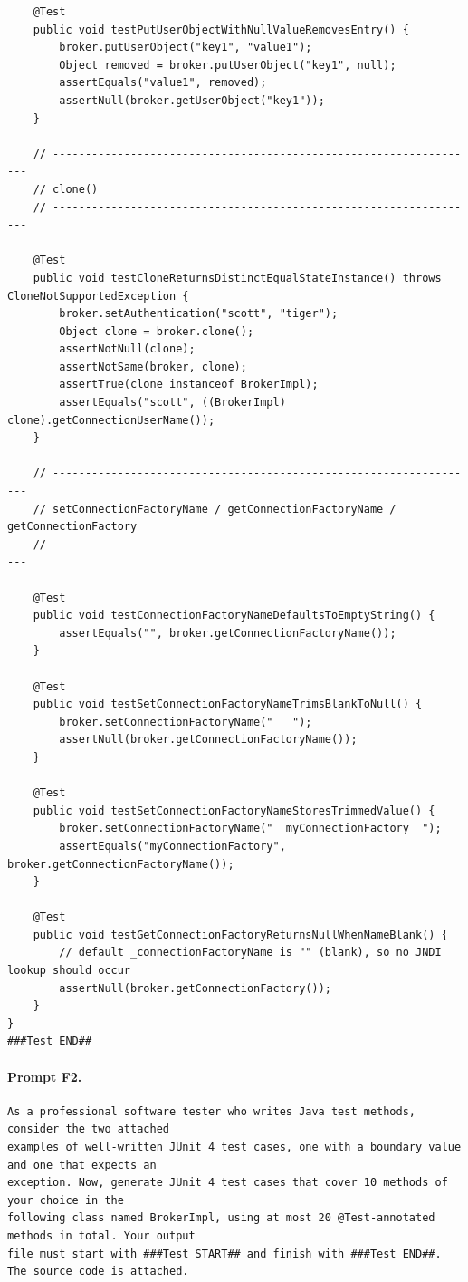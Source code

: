 \begin{lstlisting}
    @Test
    public void testPutUserObjectWithNullValueRemovesEntry() {
        broker.putUserObject("key1", "value1");
        Object removed = broker.putUserObject("key1", null);
        assertEquals("value1", removed);
        assertNull(broker.getUserObject("key1"));
    }

    // ------------------------------------------------------------------
    // clone()
    // ------------------------------------------------------------------

    @Test
    public void testCloneReturnsDistinctEqualStateInstance() throws CloneNotSupportedException {
        broker.setAuthentication("scott", "tiger");
        Object clone = broker.clone();
        assertNotNull(clone);
        assertNotSame(broker, clone);
        assertTrue(clone instanceof BrokerImpl);
        assertEquals("scott", ((BrokerImpl) clone).getConnectionUserName());
    }

    // ------------------------------------------------------------------
    // setConnectionFactoryName / getConnectionFactoryName / getConnectionFactory
    // ------------------------------------------------------------------

    @Test
    public void testConnectionFactoryNameDefaultsToEmptyString() {
        assertEquals("", broker.getConnectionFactoryName());
    }

    @Test
    public void testSetConnectionFactoryNameTrimsBlankToNull() {
        broker.setConnectionFactoryName("   ");
        assertNull(broker.getConnectionFactoryName());
    }

    @Test
    public void testSetConnectionFactoryNameStoresTrimmedValue() {
        broker.setConnectionFactoryName("  myConnectionFactory  ");
        assertEquals("myConnectionFactory", broker.getConnectionFactoryName());
    }

    @Test
    public void testGetConnectionFactoryReturnsNullWhenNameBlank() {
        // default _connectionFactoryName is "" (blank), so no JNDI lookup should occur
        assertNull(broker.getConnectionFactory());
    }
}
###Test END##
\end{lstlisting}

\paragraph*{Prompt F2.}
\label{prompt:f2}
\begin{lstlisting}
As a professional software tester who writes Java test methods, consider the two attached
examples of well-written JUnit 4 test cases, one with a boundary value and one that expects an
exception. Now, generate JUnit 4 test cases that cover 10 methods of your choice in the
following class named BrokerImpl, using at most 20 @Test-annotated methods in total. Your output
file must start with ###Test START## and finish with ###Test END##. The source code is attached.
\end{lstlisting}

